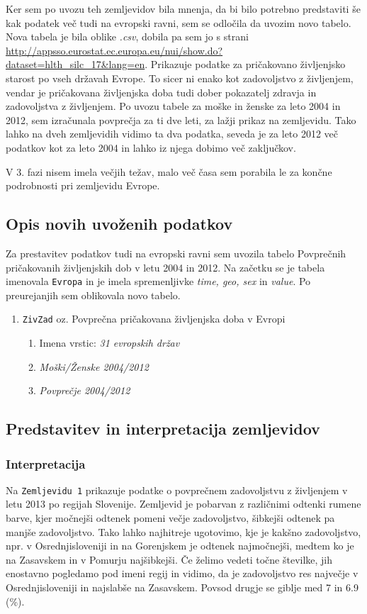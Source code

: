 \documentclass[11pt,a4paper]{article}
\begin{document}
Ker sem po uvozu teh zemljevidov bila mnenja, da bi bilo potrebno predstaviti še kak podatek več tudi na evropski ravni, sem se odločila da uvozim novo tabelo. Nova tabela je bila oblike \textit{.csv}, dobila pa sem jo s strani \url{http://appsso.eurostat.ec.europa.eu/nui/show.do?dataset=hlth_silc_17&lang=en}. Prikazuje podatke za pri\-ča\-ko\-va\-no življenjsko starost po vseh državah Evrope. To sicer ni enako kot zadovoljstvo z življenjem, vendar je pričakovana življenjska doba tudi dober pokazatelj zdravja in zadovoljstva z življenjem. Po uvozu tabele za moške in ženske za leto 2004 in 2012, sem izračunala povprečja za ti dve leti, za lažji prikaz na zemljevidu.  Tako lahko na dveh zemljevidih vidimo ta dva podatka, seveda je za leto 2012 več podatkov kot za leto 2004 in lahko iz njega dobimo več zaključkov.

V 3. fazi nisem imela večjih težav, malo več časa sem porabila le za končne podrobnosti pri zemljevidu Evrope.
\subsection{Opis novih uvoženih podatkov}
Za prestavitev podatkov tudi na evropski ravni sem uvozila tabelo Povprečnih pričakovanih življenjskih dob v letu 2004 in 2012. Na začetku se je tabela imenovala \verb+Evropa+ in je imela spremenljivke \textit{time, geo, sex} in \textit{value}. Po preurejanjih sem oblikovala novo tabelo.
\begin{enumerate}
\item \verb+ZivZad+ oz. Povprečna pričakovana življenjska doba v Evropi
\begin{enumerate}
\item Imena vrstic: \textit{31 evropskih držav}
\item \textit{Moški/Ženske 2004/2012} 
\item \textit{Povprečje 2004/2012} 
\end{enumerate}
\end{enumerate}
\subsection{Predstavitev in interpretacija zemljevidov}

\subsubsection{Interpretacija}
Na \verb+Zemljevidu 1+ prikazuje podatke o povprečnem zadovoljstvu z življenjem v letu 2013 po regijah Slovenije. Zemljevid je pobarvan z različnimi odtenki rumene barve, kjer močnejši odtenek pomeni večje zadovoljstvo, šibkejši odtenek pa manjše zadovoljstvo. Tako lahko najhitreje ugotovimo, kje je kakšno zadovoljstvo, npr. v Osrednjisloveniji in na Gorenjskem je odtenek najmočnejši, medtem ko je na Zasavskem in v Pomurju najšibkejši. Če želimo vedeti točne številke, jih enostavno pogledamo pod imeni regij in vidimo, da je zadovoljstvo res največje v Osrednjisloveniji in najslabše na Zasavskem. Povsod drugje se giblje med 7 in 6.9 (\%).

\end{document}
